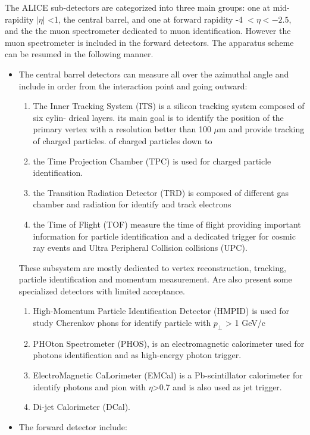 \documentclass[12pt,a4paper]{book}
\begin{document}
   	
	The ALICE sub-detectors are categorized into three main	groups: one at mid-rapidity $|\eta|$ <1, the central barrel, and one at forward rapidity -4 $< \eta < -2.5$, and the the muon spectrometer dedicated to muon identification.  However the muon spectrometer is included in the forward detectors.  The apparatus scheme can be resumed in the following manner.
	\begin{itemize}
		\item The central barrel detectors can measure all over the azimuthal angle and include in order from the interaction point and going outward:
		\begin{enumerate}
			\item The Inner Tracking System (ITS) is a silicon tracking system composed of six cylin-
			drical layers. its main goal is to identify the	position of the primary vertex with a resolution better than 100 $\mu$m and provide tracking of charged particles.
			of charged particles down to
			\item the Time Projection Chamber (TPC) is used for charged particle identification.
			\item the Transition Radiation Detector (TRD) is composed of different gas chamber and radiation for identify and track electrons
			\item the Time of Flight (TOF) measure the time of flight providing important information for particle identification and a dedicated trigger for cosmic ray events and Ultra Peripheral Collision collisions (UPC).
		\end{enumerate}
		These subsystem are mostly dedicated to vertex reconstruction, tracking, particle identification and momentum measurement. Are also present some specialized detectors with limited acceptance. 
		\begin{enumerate}
			\item High-Momentum Particle Identification Detector (HMPID) is used for study Cherenkov phons for identify particle with $p_\perp$ > 1 GeV/c
			\item PHOton Spectrometer (PHOS), is an electromagnetic calorimeter used for photons identification and as high-energy photon trigger.
			\item ElectroMagnetic CaLorimeter (EMCal) is a Pb-scintillator calorimeter  for identify photons and pion with $\eta$>0.7 and is also used as jet trigger.
			\item  Di-jet Calorimeter (DCal).
		\end{enumerate}
		\item 	The forward detector include:

\end{itemize}
\end{document}
